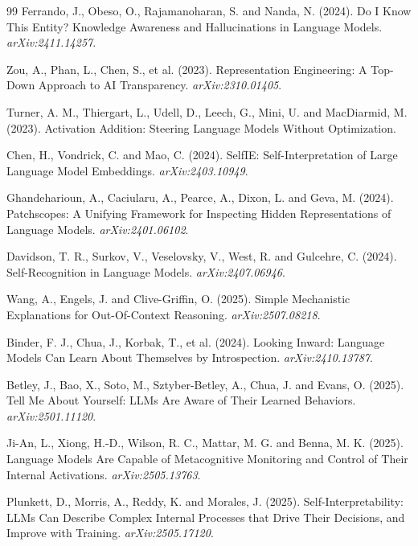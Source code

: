 \begin{thebibliography}{99}
Ferrando, J., Obeso, O., Rajamanoharan, S. and Nanda, N. (2024). Do I Know This
Entity? Knowledge Awareness and Hallucinations in Language Models.
\textit{arXiv:2411.14257}.

Zou, A., Phan, L., Chen, S., et al. (2023). Representation Engineering: A
Top-Down Approach to AI Transparency. \textit{arXiv:2310.01405}.

Turner, A. M., Thiergart, L., Udell, D., Leech, G., Mini, U. and MacDiarmid, M.
(2023). Activation Addition: Steering Language Models Without Optimization.

Chen, H., Vondrick, C. and Mao, C. (2024). SelfIE: Self-Interpretation of Large
Language Model Embeddings. \textit{arXiv:2403.10949}.

Ghandeharioun, A., Caciularu, A., Pearce, A., Dixon, L. and Geva, M. (2024).
Patchscopes: A Unifying Framework for Inspecting Hidden Representations of
Language Models. \textit{arXiv:2401.06102}.

Davidson, T. R., Surkov, V., Veselovsky, V., West, R. and Gulcehre, C. (2024).
Self-Recognition in Language Models. \textit{arXiv:2407.06946}.

Wang, A., Engels, J. and Clive-Griffin, O. (2025). Simple Mechanistic
Explanations for Out-Of-Context Reasoning. \textit{arXiv:2507.08218}.

Binder, F. J., Chua, J., Korbak, T., et al. (2024). Looking Inward: Language
Models Can Learn About Themselves by Introspection. \textit{arXiv:2410.13787}.

Betley, J., Bao, X., Soto, M., Sztyber-Betley, A., Chua, J. and Evans, O.
(2025). Tell Me About Yourself: LLMs Are Aware of Their Learned Behaviors.
\textit{arXiv:2501.11120}.

Ji-An, L., Xiong, H.-D., Wilson, R. C., Mattar, M. G. and Benna, M. K. (2025).
Language Models Are Capable of Metacognitive Monitoring and Control of Their
Internal Activations. \textit{arXiv:2505.13763}.

Plunkett, D., Morris, A., Reddy, K. and Morales, J. (2025). Self-Interpretability:
LLMs Can Describe Complex Internal Processes that Drive Their Decisions, and
Improve with Training. \textit{arXiv:2505.17120}.


\end{thebibliography}
